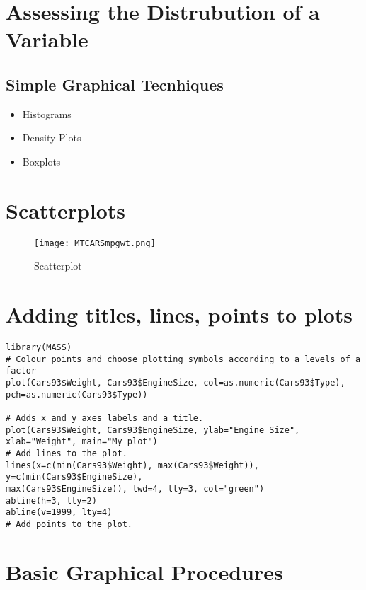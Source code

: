 \documentclass[11pt]{article} %
\begin{document}
\maketitle

\section{Assessing the Distrubution of a Variable}


\subsection{Simple Graphical Tecnhiques}

\begin{itemize}
\item Histograms
\item Density Plots
\item Boxplots
\end{itemize}


\section{Scatterplots}
\begin{figure}
  \texttt{[image: MTCARSmpgwt.png]}\\
  \caption{Scatterplot}\label{mpgwt}
\end{figure}


\section{Adding titles, lines, points to plots}


\footnotesize \begin{verbatim}
library(MASS)
# Colour points and choose plotting symbols according to a levels of a factor
plot(Cars93$Weight, Cars93$EngineSize, col=as.numeric(Cars93$Type),
pch=as.numeric(Cars93$Type))

# Adds x and y axes labels and a title.
plot(Cars93$Weight, Cars93$EngineSize, ylab="Engine Size",
xlab="Weight", main="My plot")
# Add lines to the plot.
lines(x=c(min(Cars93$Weight), max(Cars93$Weight)), y=c(min(Cars93$EngineSize),
max(Cars93$EngineSize)), lwd=4, lty=3, col="green")
abline(h=3, lty=2)
abline(v=1999, lty=4)
# Add points to the plot.
\end{verbatim}\normalsize



\section{Basic Graphical Procedures}
\end{document}
